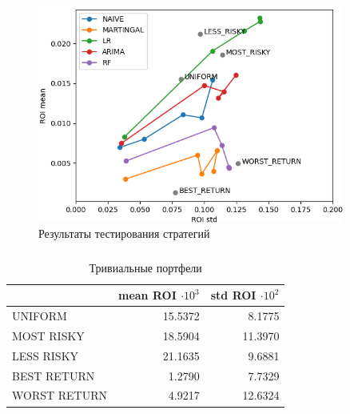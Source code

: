 \documentclass{beamer}
\begin{document}
\begin{frame}
    \begin{figure}
        \centering
        \includegraphics[width=0.9\textwidth]{result_frontiers_cut.png}
        \caption{Результаты тестирования стратегий}
        \label{fig:result_frontier}
    \end{figure}
\end{frame}

\begin{frame}
    \frametitle{}
    \begin{table}[H]
        \caption{Тривиальные портфели}
        \label{tab:trivial_rois}
        \begin{tabular}{lrr}
            \toprule
            & mean ROI $\cdot 10^3$ & std ROI $\cdot 10^2$ \\
            \midrule
            UNIFORM & 15.5372 & 8.1775 \\
            MOST RISKY & 18.5904 & 11.3970 \\
            LESS RISKY & 21.1635 & 9.6881 \\
            BEST RETURN & 1.2790 & 7.7329 \\
            WORST RETURN & 4.9217 & 12.6324 \\
            \bottomrule
        \end{tabular}
    \end{table}
\end{frame}
\end{document}
